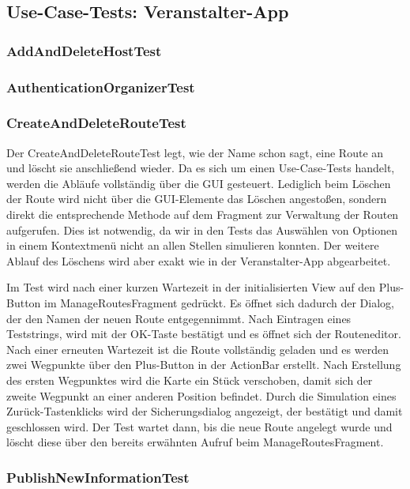 \subsection{Use-Case-Tests: Veranstalter-App}
\subsubsection{AddAndDeleteHostTest}

\subsubsection{AuthenticationOrganizerTest}

\subsubsection{CreateAndDeleteRouteTest}
Der CreateAndDeleteRouteTest legt, wie der Name schon sagt, eine Route an und löscht sie anschließend wieder. Da es sich um einen Use-Case-Tests handelt, werden die Abläufe vollständig über die GUI gesteuert. Lediglich beim Löschen der Route wird nicht über die GUI-Elemente das Löschen angestoßen, sondern direkt die entsprechende Methode auf dem Fragment zur Verwaltung der Routen aufgerufen. Dies ist notwendig, da wir in den Tests das Auswählen von Optionen in einem Kontextmenü nicht an allen Stellen simulieren konnten. Der weitere Ablauf des Löschens wird aber exakt wie in der Veranstalter-App abgearbeitet.

Im Test wird nach einer kurzen Wartezeit in der initialisierten View auf den Plus-Button im ManageRoutesFragment gedrückt. Es öffnet sich dadurch der Dialog, der den Namen der neuen Route entgegennimmt. Nach Eintragen eines Teststrings, wird mit der OK-Taste bestätigt und es öffnet sich der Routeneditor. Nach einer erneuten Wartezeit ist die Route vollständig geladen und es werden zwei Wegpunkte über den Plus-Button in der ActionBar erstellt. Nach Erstellung des ersten Wegpunktes wird die Karte ein Stück verschoben, damit sich der zweite Wegpunkt an einer anderen Position befindet. Durch die Simulation eines Zurück-Tastenklicks wird der Sicherungsdialog angezeigt, der bestätigt und damit geschlossen wird. Der Test wartet dann, bis die neue Route angelegt wurde und löscht diese über den bereits erwähnten Aufruf beim ManageRoutesFragment.

\subsubsection{PublishNewInformationTest}

